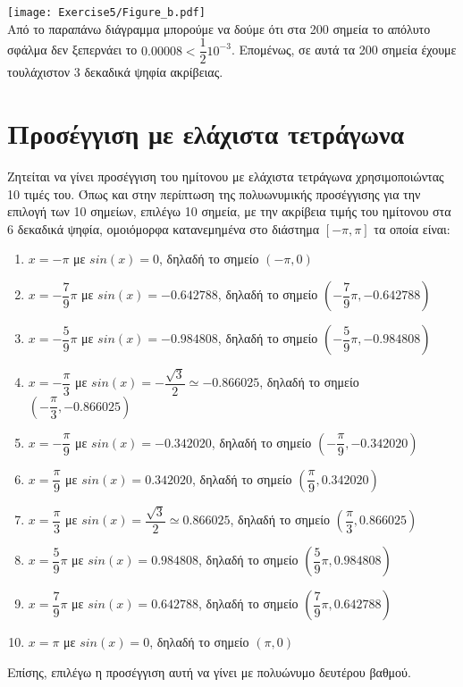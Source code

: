 \documentclass[a4paper,11pt]{article}
\newcommand{\lt}{\latintext}
\begin{document}
\texttt{[image: Exercise5/Figure\_b.pdf]}\\
Από το παραπάνω διάγραμμα μπορούμε να δούμε ότι στα 200 σημεία το απόλυτο σφάλμα δεν ξεπερνάει το $0.00008 < \dfrac{1}{2}10^{-3}$. Επομένως, σε αυτά τα 200 σημεία έχουμε τουλάχιστον 3 δεκαδικά ψηφία ακρίβειας.


\section{Προσέγγιση με ελάχιστα τετράγωνα}
Ζητείται να γίνει προσέγγιση του ημίτονου με ελάχιστα τετράγωνα χρησιμοποιώντας 10 τιμές του. Όπως και στην περίπτωση της πολυωνυμικής προσέγγισης για την επιλογή των 10 σημείων, επιλέγω 10 σημεία, με την ακρίβεια τιμής του ημίτονου στα 6 δεκαδικά ψηφία, ομοιόμορφα κατανεμημένα στο διάστημα $[-\pi, \pi]$ τα οποία είναι:
\begin{enumerate}
    \item {\lt $x = -\pi$} με {\lt $sin(x) = 0$}, δηλαδή το σημείο $(-\pi, 0)$
    \item {\lt $x = -\dfrac{7}{9}\pi$} με {\lt $sin(x) = -0.642788$}, δηλαδή το σημείο $(-\dfrac{7}{9}\pi, -0.642788)$
    \item {\lt $x = -\dfrac{5}{9}\pi$} με {\lt $sin(x) = -0.984808$}, δηλαδή το σημείο $(-\dfrac{5}{9}\pi, -0.984808)$
    \item {\lt $x = -\dfrac{\pi}{3}$} με {\lt $sin(x) = -\dfrac{\sqrt{3}}{2} \simeq -0.866025$}, δηλαδή το σημείο $(-\dfrac{\pi}{3}, -0.866025)$
    \item {\lt $x = -\dfrac{\pi}{9}$} με {\lt $sin(x) = -0.342020$}, δηλαδή το σημείο $(-\dfrac{\pi}{9}, -0.342020)$
    \item {\lt $x = \dfrac{\pi}{9}$} με {\lt $sin(x) = 0.342020$}, δηλαδή το σημείο $(\dfrac{\pi}{9}, 0.342020)$
    \item {\lt $x = \dfrac{\pi}{3}$} με {\lt $sin(x) = \dfrac{\sqrt{3}}{2} \simeq 0.866025$}, δηλαδή το σημείο $(\dfrac{\pi}{3}, 0.866025)$
    \item {\lt $x = \dfrac{5}{9}\pi$} με {\lt $sin(x) = 0.984808$}, δηλαδή το σημείο $(\dfrac{5}{9}\pi, 0.984808)$
    \item {\lt $x = \dfrac{7}{9}\pi$} με {\lt $sin(x) = 0.642788$}, δηλαδή το σημείο $(\dfrac{7}{9}\pi, 0.642788)$
    \item {\lt $x = \pi$} με {\lt $sin(x) = 0$}, δηλαδή το σημείο $(\pi, 0)$
\end{enumerate}
Επίσης, επιλέγω η προσέγγιση αυτή να γίνει με πολυώνυμο δευτέρου βαθμού.
\end{document}
